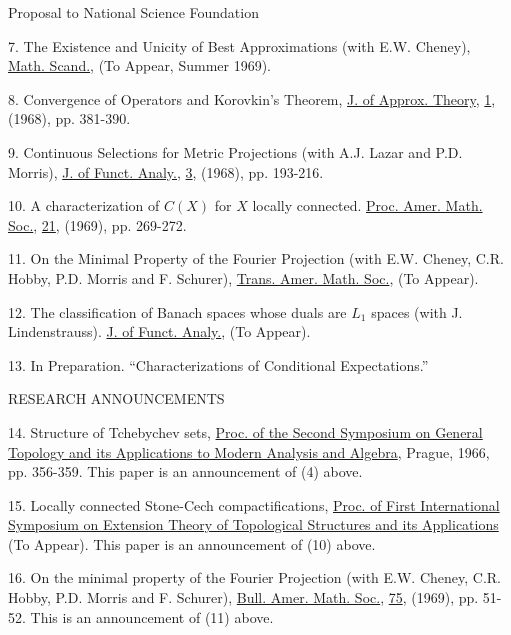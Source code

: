 
Proposal to National Science Foundation

7. The Existence and Unicity of Best Approximations (with E.W. Cheney), \uline{Math. Scand.}, (To Appear, Summer 1969).

8. Convergence of Operators and Korovkin's Theorem, \uline{J. of Approx. Theory}, \uline{1}, (1968), pp. 381-390.

9. Continuous Selections for Metric Projections (with A.J. Lazar and P.D. Morris), \uline{J. of Funct. Analy.}, \uline{3}, (1968), pp. 193-216.

10. A characterization of $C(X)$ for $X$ locally connected. \uline{Proc. Amer. Math. Soc.}, \uline{21}, (1969), pp. 269-272.

11. On the Minimal Property of the Fourier Projection (with E.W. Cheney, C.R. Hobby, P.D. Morris and F. Schurer), \uline{Trans. Amer. Math. Soc.}, (To Appear).

12. The classification of Banach spaces whose duals are $L_{1}$ spaces (with J. Lindenstrauss). \uline{J. of Funct. Analy.}, (To Appear).

13. In Preparation. ``Characterizations of Conditional Expectations.''

RESEARCH ANNOUNCEMENTS

14. Structure of Tchebychev sets, \uline{Proc. of the Second Symposium on General Topology and its Applications to Modern Analysis and Algebra}, Prague, 1966, pp. 356-359. This paper is an announcement of (4) above.

15. Locally connected Stone-Cech compactifications, \uline{Proc. of First International Symposium on Extension Theory of Topological Structures and its Applications} (To Appear). This paper is an announcement of (10) above.

16. On the minimal property of the Fourier Projection (with E.W. Cheney, C.R. Hobby, P.D. Morris and F. Schurer), \uline{Bull. Amer. Math. Soc.}, \uline{75}, (1969), pp. 51-52. This is an announcement of (11) above.
